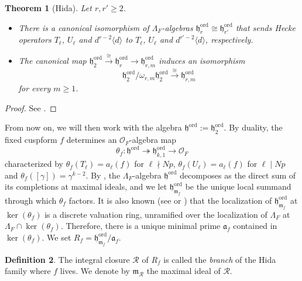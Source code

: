 \documentclass[12pt,reqno]{amsart}
\newtheorem{theorem}{Theorem}[section]
\theoremstyle{definition}
\newtheorem{definition}[theorem]{Definition}
\theoremstyle{remark}
\newcommand{\OF}{\mathcal{O}_F}
\DeclareMathOperator{\ord}{ord}
\newcommand{\gL}{\Lambda}
\newcommand{\m}{\mathfrak{m}}
\newcommand{\h}{\mathfrak{h}}
\begin{document}
    \begin{theorem}[Hida]\label{thm:first-Hida-structure-theorem}
    Let $r,r'\ge 2$.
    \begin{itemize}
        \item[(a)] There is a canonical isomorphism of $\gL_F$-algebras $\mathfrak{h}_r^{\ord}\cong \mathfrak{h}_{r'}^{\ord}$ that sends Hecke operators $T_\ell$, $U_\ell$ and $d^{r-2}\langle d\rangle$ to $T_\ell$, $U_\ell$ and $d^{r'-2}\langle d\rangle$, respectively. 
        \item[(b)] The canonical map $\mathfrak{h}_2^{\ord}\overset{\cong}{\to}\mathfrak{h}_{r}^{\ord}\to \mathfrak{h}_{r,m}^{\ord}$ induces an isomorphism
    \begin{equation*}
        \mathfrak{h}_2^{\ord}/\omega_{r,m}\mathfrak{h}_2^{\ord}\overset{\cong}{\longrightarrow} \mathfrak{h}_{r,m}^{\ord}
    \end{equation*}
    for every $m\ge 1$.
    \end{itemize}
    \end{theorem}
    \begin{proof}
        See \cite[Proposition 1.4.3]{Nekovar-Plater:parity-selmer-groups}.
    \end{proof}
    From now on, we will then work with the algebra $\h^{\ord}:=\h_2^{\ord}$. By duality, the fixed cuspform $f$ determines an $\OF$-algebra map
    \begin{equation}\label{eq:theta-f}
        \theta_f\colon \h^{\ord}\twoheadrightarrow \h_{k,1}^{\ord}\to\OF
    \end{equation}
    characterized by $\theta_f(T_\ell)=a_\ell(f)$ for $\ell\nmid Np$,  $\theta_f(U_\ell)=a_\ell(f)$ for $\ell\mid Np$ and $\theta_f([\gamma])=\gamma^{k-2}$. By \cite[Corollary 7.6]{Eisenbud:commutative-algebra}, the $\gL_F$-algebra $\h^{\ord}$ decomposes as the direct sum of its completions at maximal ideals, and we let $\h_{\m_f}^{\ord}$ be the unique local summand through which $\theta_f$ factors. It is also known (see \cite[§12.7.5]{Nekovar06:selmer-complexes} or \cite[Corollary 1.4]{Hida86:Galois-representations}) that the localization of $\h_{\m_f}^{\ord}$ at $\ker(\theta_f)$ is a discrete valuation ring, unramified over the localization of $\gL_F$ at $\gL_F\cap \ker(\theta_f)$. Therefore, there is a unique minimal prime $\mathfrak{a}_f$ contained in $\ker(\theta_f)$. We set $R_f=\h_{\m_f}^{\ord}/\mathfrak{a}_f$.

    \begin{definition}
        The integral closure $\mathcal{R}$ of $R_f$ is called the \emph{branch} of the Hida family where $f$ lives. We denote by $\m_{\mathcal{R}}$ the maximal ideal of $\mathcal{R}$.
    \end{definition}
\end{document}
